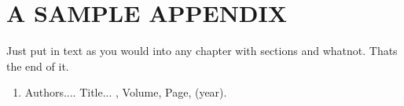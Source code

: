 \documentclass[BTech]{iitmdiss}
\begin{document}
\appendix

\chapter{A SAMPLE APPENDIX}

Just put in text as you would into any chapter with sections and
whatnot.  Thats the end of it.


\begin{singlespace}
  
\end{singlespace}



\listofpapers

\begin{enumerate}  
\item Authors....  \newblock
 Title...
  , Volume,
  Page, (year).
\end{enumerate}  
\end{document}

